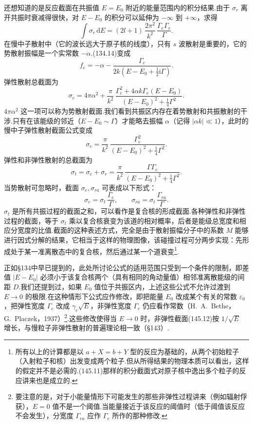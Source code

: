 还想知道的是反应截面在共振值 $E=E_0$ 附近的能量范围内的积分结果.由于 $\sigma_r$ 离开共振时衰减得很快，对 $E-E_0$ 的积分可以延伸为 $-\infty$ 到 $+\infty$，求得
\begin{equation}
  \int\sigma_r\,\mathrm{d}E=(2l+1)\,\frac{2\pi^2}{k^2}\,\frac{\Gamma_e\Gamma_r}{\Gamma}.
\end{equation}
在慢中子散射中（它的波长远大于原子核的线度），只有 $s$ 波散射是重要的，它的势散射振幅是一个实常数 $-\alpha$.(134.14)变成
\begin{equation}
  f_e=-\alpha-\frac{\Gamma_e}{2k\left(E-E_0+\frac{1}{2}\mathrm{i}\Gamma\right)}.
\end{equation}
弹性散射总截面为
\begin{equation}
  \sigma_e=4\pi\alpha^2+\frac{\pi}{k^2}\,
  \frac{\Gamma_e^2+4\alpha k\Gamma_e(E-E_0)}{(E-E_0)^2+\frac{1}{4}\Gamma^2}.
\end{equation}
$4\pi\alpha^2$ 这一项可以称为势散射截面.我们看到共振区内存在着势散射和共振散射的干涉.只有在该能级的邻近（$E-E_0\sim\Gamma$）才能略去振幅 $\alpha$（记得 $|\alpha k|\ll1$），此时的慢中子弹性散射截面公式变成
\begin{equation}
  \sigma_e=\frac{\pi}{k^2}\,
  \frac{\Gamma_e^2}{(E-E_0)^2+\frac{1}{4}\Gamma^2}.
\end{equation}
弹性和非弹性散射的总截面为
\begin{equation}
  \sigma_t=\sigma_e+\sigma_r=\frac{\pi}{k^2}\,
  \frac{\Gamma\Gamma_e}{(E-E_0)^2+\frac{1}{4}\Gamma^2}.
\end{equation}
当势散射可忽略时，截面 $\sigma_e,\sigma_{ra}$ 可表成以下形式：
\begin{equation*}
  \sigma_e=\sigma_t\,\frac{\Gamma_e}{\Gamma},\qquad
  \sigma_{ra}=\sigma_t\,\frac{\Gamma_{ra}}{\Gamma}.
\end{equation*}
$\sigma_t$ 是所有共振过程的截面之和，可以看作是复合核的形成截面.各种弹性和非弹性过程的截面，等于 $\sigma_t$ 乘以复合核衰变为该道的相对概率，后者是能级总宽度和相应分宽度的比值.截面的这种表述方式，完全是由于散射振幅分子中的系数 $M$ 能够进行因式分解的结果，它相当于这样的物理图像，该碰撞过程可分两步实现：先形成处于某一准离散态中的复合核，然后通过某一个道衰变\footnote{所有以上的计算都是以 $a+X=b+Y$ 型的反应为基础的，从两个初始粒子（入射粒子和核）出发变成两个粒子.但从所得结果的物理本质可以看出，这样的假定并不是必需的.(145.11)那样的积分截面式对原子核中逸出多个粒子的反应讲来也是成立的.}.

正如§134中早已提到的，此处所讨论公式的适用范围只受到一个条件的限制，即差值 $|E-E_0|$ 必须小于该复合核两个（具有相同的角动量值）相邻准离散能级的间距 $D$.我们还提到过，如果 $E_0$ 值位于共振区内，上述这些公式不允许过渡到 $E\to0$ 的极限.在这种情形下公式应作修改，即把能量 $E_0$ 改成某个有关的常数 $\varepsilon_0$，把弹性宽度 $\Gamma_e$ 改成 $\gamma_e\sqrt{E}$，非弹性宽度 $\Gamma_r$ 仍应看作常数（H.~A.~Bethe，G.~Placzek，1937）\footnote{要注意的是，对于小能量情形下可能发生的那些非弹性过程讲来（例如辐射俘获），$E=0$ 值不是一个阈值.当能量接近于该反应的阈值时（低于阈值该反应不会发生），分宽度 $\Gamma_{ra}$ 应作 $\Gamma_e$ 所作的那种修改.}.这些修改使得当 $E\to0$ 时，非弹性截面(145.12)按 $1/\sqrt{E}$ 增长，与慢粒子非弹性散射的普遍理论相一致（§143）.

